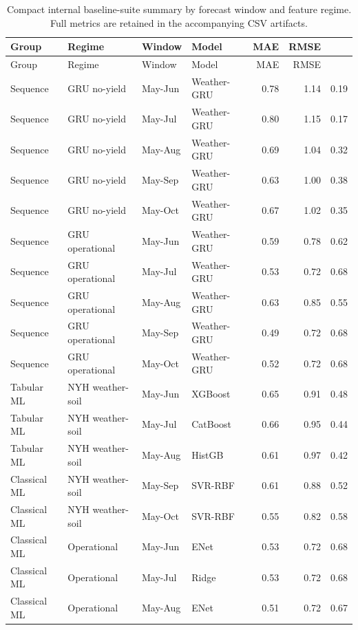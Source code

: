\tiny
\begin{longtable}{@{}p{}p{}p{}p{}rrr@{}}
\caption{Compact internal baseline-suite summary by forecast window and feature regime. Full metrics are retained in the accompanying CSV artifacts.}\label{tab:baselines-full-appendix}\\
\toprule
Group & Regime & Window & Model & MAE & RMSE & \Rsq{} \\
\midrule
\endfirsthead
\toprule
Group & Regime & Window & Model & MAE & RMSE & \Rsq{} \\
\midrule
\endhead
Sequence & GRU no-yield & May-Jun & Weather-GRU & 0.78 & 1.14 & 0.19 \\
Sequence & GRU no-yield & May-Jul & Weather-GRU & 0.80 & 1.15 & 0.17 \\
Sequence & GRU no-yield & May-Aug & Weather-GRU & 0.69 & 1.04 & 0.32 \\
Sequence & GRU no-yield & May-Sep & Weather-GRU & 0.63 & 1.00 & 0.38 \\
Sequence & GRU no-yield & May-Oct & Weather-GRU & 0.67 & 1.02 & 0.35 \\
Sequence & GRU operational & May-Jun & Weather-GRU & 0.59 & 0.78 & 0.62 \\
Sequence & GRU operational & May-Jul & Weather-GRU & 0.53 & 0.72 & 0.68 \\
Sequence & GRU operational & May-Aug & Weather-GRU & 0.63 & 0.85 & 0.55 \\
Sequence & GRU operational & May-Sep & Weather-GRU & 0.49 & 0.72 & 0.68 \\
Sequence & GRU operational & May-Oct & Weather-GRU & 0.52 & 0.72 & 0.68 \\
Tabular ML & NYH weather-soil & May-Jun & XGBoost & 0.65 & 0.91 & 0.48 \\
Tabular ML & NYH weather-soil & May-Jul & CatBoost & 0.66 & 0.95 & 0.44 \\
Tabular ML & NYH weather-soil & May-Aug & HistGB & 0.61 & 0.97 & 0.42 \\
Classical ML & NYH weather-soil & May-Sep & SVR-RBF & 0.61 & 0.88 & 0.52 \\
Classical ML & NYH weather-soil & May-Oct & SVR-RBF & 0.55 & 0.82 & 0.58 \\
Classical ML & Operational & May-Jun & ENet & 0.53 & 0.72 & 0.68 \\
Classical ML & Operational & May-Jul & Ridge & 0.53 & 0.72 & 0.68 \\
Classical ML & Operational & May-Aug & ENet & 0.51 & 0.72 & 0.67 \\

\end{longtable}
